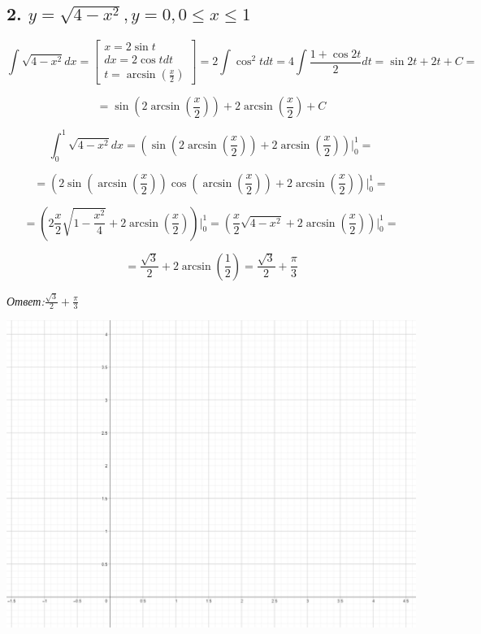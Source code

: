 \documentclass[a4paper]{article}
\begin{document}
\subsection*{2. $y = \sqrt{4-x^2}, y=0, 0 \leq x \leq 1$}

\[ \int \sqrt{4-x^2} dx  = \begin{bmatrix}
x = 2\sin t \\ dx = 2 \cos t dt \\ t = \arcsin(\frac{x}{2})
\end{bmatrix} = 2 \int \cos^2 t dt = 4 \int \frac{1+\cos 2t}{2} dt = \sin 2t + 2t + C =
\] 

\[ = \sin \left( 2 \arcsin \left( \frac{x}{2}\right) \right) + 2 \arcsin \left( \frac{x}{2} \right) + C\]

\[\int_0^1 \sqrt{4-x^2} dx  =
\left( \sin \left( 2 \arcsin \left( \frac{x}{2}\right) \right) + 2 \arcsin \left( \frac{x}{2} \right) \right) \bigg|_0^1 = \]

\[ =  \left( 2 \sin \left( \arcsin \left( \frac{x}{2} \right) \right) \cos \left( \arcsin \left( \frac{x}{2}\right) \right) + 2 \arcsin \left( \frac{x}{2} \right) \right) \bigg|_0^1 = 
\]

\[
= \left( 2 \frac{x}{2} \sqrt{1-\frac{x^2}{4}} + 2 \arcsin \left( \frac{x}{2} \right) \right) \bigg|_0^1
= \left( \frac{x}{2} \sqrt{4-x^2} + 2 \arcsin \left( \frac{x}{2} \right) \right) \bigg|_0^1
=
\]

\[
=
\frac{\sqrt{3}}{2} + 2 \arcsin \left( \frac{1}{2} \right) = \frac{\sqrt{3}}{2} + \frac{\pi}{3}
\]

\textit{Ответ:$\frac{\sqrt{3}}{2} + \frac{\pi}{3}$}

\includegraphics[width=18cm]{graphic.png}
\end{document}
